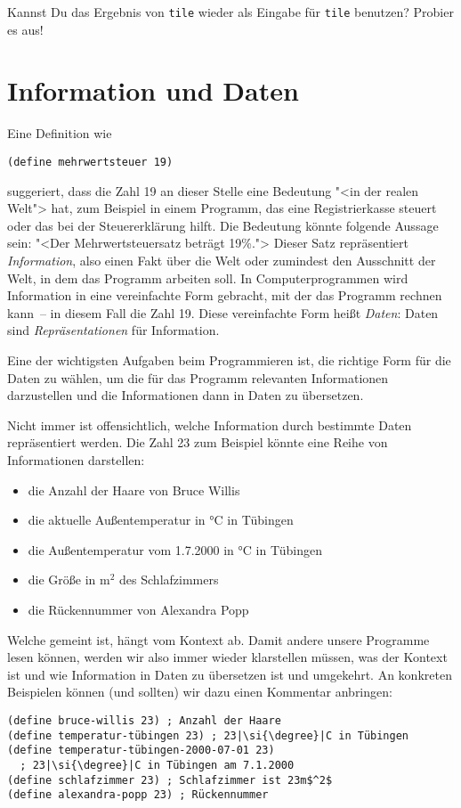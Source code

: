 \begin{aufgabeinline}
  Kannst Du das Ergebnis von \lstinline{tile} wieder als Eingabe für
  \lstinline{tile} benutzen?  Probier es aus!
\end{aufgabeinline}

\section{Information und Daten}
\label{sec:information-daten}

Eine Definition wie
%
\begin{lstlisting}
(define mehrwertsteuer 19)
\end{lstlisting}
%
suggeriert, dass die Zahl 19 an dieser Stelle eine Bedeutung "<in der
realen Welt"> hat, zum Beispiel in einem Programm, das eine Registrierkasse
steuert oder das bei der Steuererklärung hilft.  Die Bedeutung könnte
folgende Aussage sein: "<Der Mehrwertsteuersatz beträgt 19\%.">
Dieser Satz repräsentiert \textit{Information},
also einen Fakt über die Welt oder zumindest den Ausschnitt der Welt, in
dem das Programm arbeiten soll.  In Computerprogrammen wird
Information in eine vereinfachte Form gebracht, mit der das Programm
rechnen kann~-- in diesem Fall die Zahl 19.  Diese vereinfachte Form
heißt \textit{Daten}: Daten sind
\textit{Repräsentationen} für Information.

Eine der wichtigsten Aufgaben beim Programmieren ist, die richtige
Form für die Daten zu wählen, um die für das Programm relevanten
Informationen darzustellen und die Informationen dann in Daten zu
übersetzen.

Nicht immer ist offensichtlich, welche Information durch bestimmte
Daten repräsentiert werden.  Die Zahl 23 zum Beispiel könnte eine Reihe
von Informationen darstellen:
%
\begin{itemize}
\item die Anzahl der Haare von Bruce Willis
\item die aktuelle Außentemperatur in °C in Tübingen
\item die Außentemperatur vom 1.7.2000 in °C in Tübingen
\item die Größe in m$^2$ des Schlafzimmers
\item die Rückennummer von Alexandra Popp
\end{itemize}
%
Welche gemeint ist, hängt vom Kontext ab.  Damit andere unsere
Programme lesen können, werden wir also immer wieder klarstellen
müssen, was der Kontext ist und wie Information in Daten zu übersetzen
ist und umgekehrt.  An konkreten Beispielen können (und sollten) wir
dazu einen Kommentar anbringen:
%
\begin{lstlisting}
(define bruce-willis 23) ; Anzahl der Haare
(define temperatur-tübingen 23) ; 23|\si{\degree}|C in Tübingen
(define temperatur-tübingen-2000-07-01 23)
  ; 23|\si{\degree}|C in Tübingen am 7.1.2000
(define schlafzimmer 23) ; Schlafzimmer ist 23m$^2$
(define alexandra-popp 23) ; Rückennummer
\end{lstlisting}

